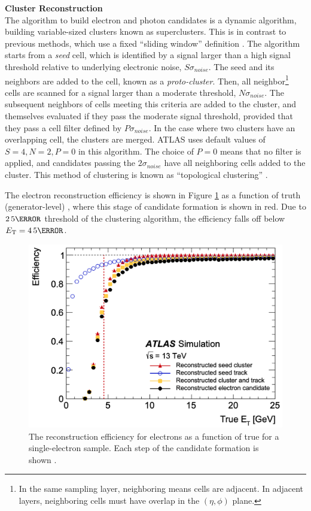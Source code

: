 \noindent\textbf{Cluster Reconstruction}\\
\indent The algorithm to build electron and photon candidates is a dynamic algorithm, building variable-sized clusters known as superclusters. This is in contrast to previous methods, which use a fixed ``sliding window'' definition \cite{sliding-window}. The algorithm starts from a \textit{seed} cell, which is identified by a signal larger than a high signal threshold relative to underlying electronic noise, $S\sigma_{noise}$. The seed and its neighbors are added to the cell, known as a \textit{proto-cluster}. Then, all neighbor\footnote{In the same sampling layer, neighboring means cells are adjacent. In adjacent layers, neighboring cells must have overlap in the $(\eta,\phi)$ plane.} cells are scanned for a signal larger than a moderate threshold, $N\sigma_{noise}$. The subsequent neighbors of cells meeting this criteria are added to the cluster, and themselves evaluated if they pass the moderate signal threshold, provided that they pass a cell filter defined by $P\sigma_{noise}$. In the case where two clusters have an overlapping cell, the clusters are merged. ATLAS uses default values of $S=4,N=2,P=0$ in this algorithm. The choice of $P=0$ means that no filter is applied, and candidates passing the $2\sigma_{noise}$ have all neighboring cells added to the cluster. This method of clustering is known as  ``topological clustering'' \cite{topo-cluster}. 





The electron reconstruction efficiency is shown in Figure \ref{fig:electron-eff} as a function of truth (generator-level) \et, where this stage of candidate formation is shown in red. Due to $\unit{2.5}{\GeV}$ threshold of the clustering algorithm, the efficiency falls off below $\et = \unit{4.5}{\GeV}$.



\begin{figure}[!thp]
    \centering
    \includegraphics[width=.65\textwidth]{chapters/chapter3_eventreco/images/electron-efficiency.png}

    \caption[The reconstruction efficiency for electrons as a function of true \et.]{The reconstruction efficiency for electrons as a function of true \et for a single-electron sample. Each step of the candidate formation is shown \cite{electron-efficiency}.}
    \label{fig:electron-eff}
\end{figure}

